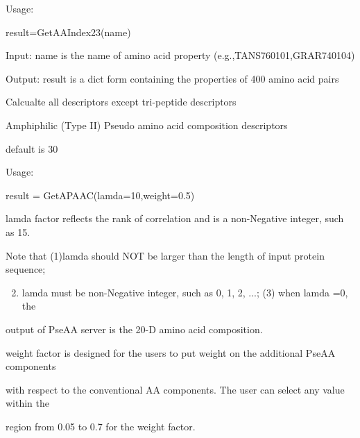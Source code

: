 \documentclass[letterpaper,10pt,english]{sphinxmanual}
\begin{document}
\begin{fulllineitems}
\begin{fulllineitems}
Usage:

result=GetAAIndex23(name)

Input: name is the name of amino acid property (e.g.,TANS760101,GRAR740104)

Output: result is a dict form containing the properties of 400 amino acid pairs

\end{fulllineitems}


\begin{fulllineitems}
\label{reference/PyProteinclass:PyProtein.PyProtein.GetALL}
Calcualte all descriptors except tri-peptide descriptors

\end{fulllineitems}


\begin{fulllineitems}
\label{reference/PyProteinclass:PyProtein.PyProtein.GetAPAAC}
Amphiphilic (Type II) Pseudo amino acid composition descriptors

default is 30

Usage:

result = GetAPAAC(lamda=10,weight=0.5)

lamda factor reflects the rank of correlation and is a non-Negative integer, such as 15.

Note that (1)lamda should NOT be larger than the length of input protein sequence;
\begin{enumerate}
\setcounter{enumi}{1}
\item {} 
lamda must be non-Negative integer, such as 0, 1, 2, ...; (3) when lamda =0, the

\end{enumerate}

output of PseAA server is the 20-D amino acid composition.

weight factor is designed for the users to put weight on the additional PseAA components

with respect to the conventional AA components. The user can select any value within the

region from 0.05 to 0.7 for the weight factor.

\end{fulllineitems}


\end{fulllineitems}
\end{document}
